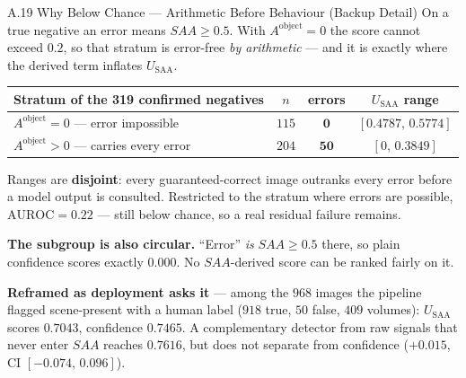 \documentclass[aspectratio=169,11pt]{beamer}
\begin{document}
\begin{frame}{A.19 Why Below Chance --- Arithmetic Before Behaviour (Backup Detail)}
\scriptsize
On a true negative an error means $SAA\ge0.5$. With $A^{\text{object}}=0$ the score cannot exceed $0.2$, so that stratum is error-free \emph{by arithmetic} --- and it is exactly where the derived term inflates $U_{\text{SAA}}$.
\vspace{1mm}
\begin{center}
\footnotesize
\begin{tabular}{@{}l c c c@{}}
\toprule
\textbf{Stratum of the 319 confirmed negatives} & \textbf{$n$} & \textbf{errors} & \textbf{$U_{\text{SAA}}$ range} \\
\midrule
$A^{\text{object}}=0$ --- error impossible & $115$ & $\mathbf{0}$ & $[0.4787,\,0.5774]$ \\
$A^{\text{object}}>0$ --- carries every error & $204$ & $\mathbf{50}$ & $[0,\,0.3849]$ \\
\bottomrule
\end{tabular}
\end{center}
\vspace{1mm}
Ranges are \textbf{disjoint}: every guaranteed-correct image outranks every error before a model output is consulted. Restricted to the stratum where errors are possible, $\text{AUROC}=0.22$ --- still below chance, so a real residual failure remains.
\vspace{1.5mm}

\textbf{The subgroup is also circular.} ``Error'' \emph{is} $SAA\ge0.5$ there, so plain confidence scores exactly $0.000$. No $SAA$-derived score can be ranked fairly on it.
\vspace{1.5mm}

\textbf{Reframed as deployment asks it} --- among the $968$ images the pipeline flagged scene-present with a human label ($918$ true, $50$ false, $409$ volumes): $U_{\text{SAA}}$ scores $\mathbf{0.7043}$, confidence $0.7465$. A complementary detector from raw signals that never enter $SAA$ reaches $0.7616$, but does not separate from confidence ($+0.015$, CI $[-0.074,\,0.096]$).
\end{frame}
\end{document}
